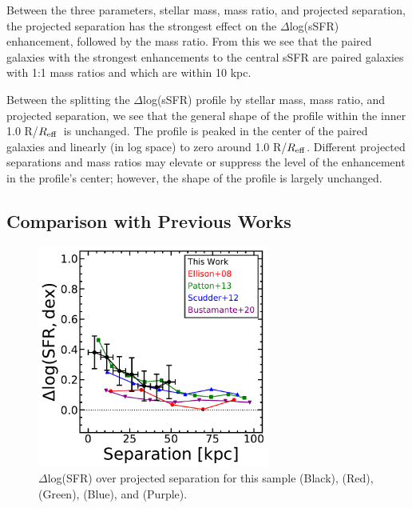 \documentclass[iop,revtex4,twocolumn,apj,numberedappendix,appendixfloats]{emulateapj}
\newcommand{\reff}{$R_{\rm eff}$}
\begin{document}
Between the three parameters, stellar mass, mass ratio, and projected separation, the projected separation has the strongest effect on the $\Delta$log(sSFR) enhancement, followed by the mass ratio. From this we see that the paired galaxies with the strongest enhancements to the central sSFR are paired galaxies with 1:1 mass ratios and  which are within 10 kpc. 

Between the splitting the $\Delta$log(sSFR) profile by stellar mass, mass ratio, and projected separation, we see that the general shape of the profile within the inner 1.0 R/\reff\ is unchanged. The profile is peaked in the center of the paired galaxies and linearly (in log space) to zero around 1.0 R/\reff. Different projected separations and mass ratios may elevate or suppress the level of the enhancement in the profile's center; however, the shape of the profile is largely unchanged.

\subsection{Comparison with Previous Works}

\begin{figure}
\centering
\includegraphics[width=3in]{fig/nuc_sep.pdf}
\caption[]{$\Delta$log(SFR) over projected separation for this sample (Black), \citet{Ellison:2008} (Red), \citet{Patton:2013} (Green), \citet{Scudder:2012} (Blue), and \citet{Bustamante:2020} (Purple). }
\label{fig:nuc_sep}
\end{figure}
\end{document}
